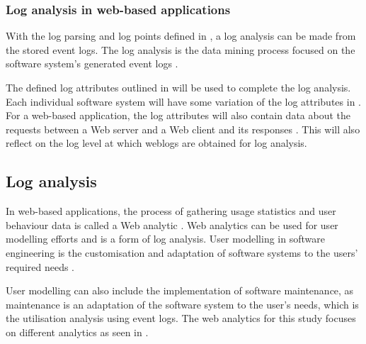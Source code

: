 \subsubsection{Log analysis in web-based applications}
With the log parsing and log points defined in , a log analysis can be made from the stored event logs. The log analysis is the data mining process focused on the software system's generated event logs \cite{Slaninova2014,Hasiloglu2018}. \par The defined log attributes outlined in  will be used to complete the log analysis. Each individual software system will have some variation of the log attributes in . For a web-based application, the log attributes will also contain data about the requests between a Web server and a Web client and its responses \cite{Slaninova2014, Dhanalakshmi2016}. This will also reflect on the log level at which weblogs are obtained for log analysis.


\subsection{Log analysis}\label{sec:ch1_systemUtilisation}
In web-based applications, the process of gathering usage statistics and user behaviour data is called a Web analytic \cite{Kocsis2012}. Web analytics can be used for user modelling efforts and is a form of log analysis. User modelling in software engineering is the customisation and adaptation of software systems to the users' required needs \cite{Waqar2017, Paliouras1999}. \par User modelling can also include the implementation of software maintenance, as maintenance is an adaptation of the software system to the user's needs, which is the utilisation analysis using event logs. The web analytics for this study focuses on different analytics as seen in . 

